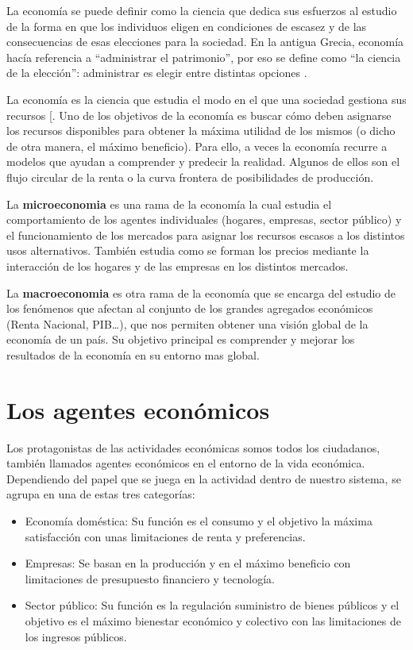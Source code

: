 \documentclass[
]{krantz}
\providecommand{\tightlist}{%
  \setlength{\itemsep}{0pt}\setlength{\parskip}{0pt}}
\begin{document}
La economía se puede definir como la ciencia que dedica sus esfuerzos al estudio de la forma en que los individuos eligen en condiciones de escasez y de las consecuencias de esas elecciones para la sociedad. En la antigua Grecia, economía hacía referencia a ``administrar el patrimonio'', por eso se define como ``la ciencia de la elección'': administrar es elegir entre distintas opciones \citep{sande2015}.

La economía es la ciencia que estudia el modo en el que una sociedad gestiona sus recursos {[}\citet{mankiw2017}. Uno de los objetivos de la economía es buscar cómo deben asignarse los recursos disponibles para obtener la máxima utilidad de los mismos (o dicho de otra manera, el máximo beneficio). Para ello, a veces la economía recurre a modelos que ayudan a comprender y predecir la realidad. Algunos de ellos son el flujo circular de la renta o la curva frontera de posibilidades de producción.

La \textbf{microeconomia} es una rama de la economía la cual estudia el comportamiento de los agentes individuales (hogares, empresas, sector público) y el funcionamiento de los mercados para asignar los recursos escasos a los distintos usos alternativos.
También estudia como se forman los precios mediante la interacción de los hogares y de las empresas en los distintos mercados.

La \textbf{macroeconomia} es otra rama de la economía que se encarga del estudio de los fenómenos que afectan al conjunto de los grandes agregados económicos (Renta Nacional, PIB\ldots), que nos permiten obtener una visión global de la economía de un país.
Su objetivo principal es comprender y mejorar los resultados de la economía en su entorno mas global.

\hypertarget{los-agentes-econuxf3micos}{%
\section{Los agentes económicos}\label{los-agentes-econuxf3micos}}

Los protagonistas de las actividades económicas somos todos los ciudadanos, también llamados agentes económicos en el entorno de la vida económica. Dependiendo del papel que se juega en la actividad dentro de nuestro sistema, se agrupa en una de estas tres categorías:

\begin{itemize}
\tightlist
\item
  Economía doméstica: Su función es el consumo y el objetivo la máxima satisfacción con unas limitaciones de renta y preferencias.
\item
  Empresas: Se basan en la producción y en el máximo beneficio con limitaciones de presupuesto financiero y tecnología.
\item
  Sector público: Su función es la regulación suministro de bienes públicos y el objetivo es el máximo bienestar económico y colectivo con las limitaciones de los ingresos públicos.
\end{itemize}
\end{document}
